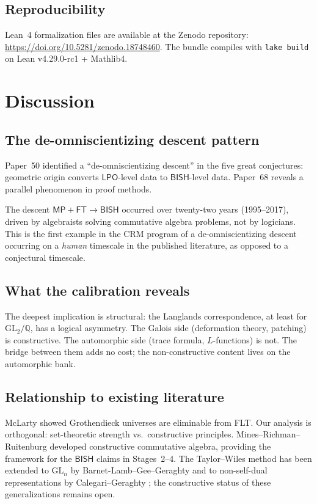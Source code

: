 \documentclass[11pt]{article}
\theoremstyle{plain}
\theoremstyle{definition}
\theoremstyle{remark}
\newcommand{\leanRepo}{\url{https://doi.org/10.5281/zenodo.18748460}}
\newcommand{\Q}{\mathbb{Q}}
\newcommand{\GL}{\mathrm{GL}}
\newcommand{\BISH}{\mathsf{BISH}}
\newcommand{\LPO}{\mathsf{LPO}}
\newcommand{\MP}{\mathsf{MP}}
\newcommand{\FT}{\mathsf{FT}}
\begin{document}
\subsection{Reproducibility}

Lean~4 formalization files are available at the Zenodo repository:
\leanRepo.  The bundle compiles with \texttt{lake build} on Lean
v4.29.0-rc1 + Mathlib4.


\section{Discussion}\label{sec:discuss}

\subsection{The de-omniscientizing descent pattern}

Paper~50 \cite{Paper50} identified a ``de-omniscientizing
descent'' in the five great conjectures: geometric origin converts
$\LPO$-level data to $\BISH$-level data.  Paper~68 reveals a
parallel phenomenon in proof methods.

The descent $\MP + \FT \to \BISH$ occurred over twenty-two
years (1995--2017), driven by algebraists solving commutative
algebra problems, not by logicians.  This is the first example
in the CRM program of a de-omniscientizing descent occurring on a
\emph{human} timescale in the published literature, as opposed
to a conjectural timescale.

\subsection{What the calibration reveals}

The deepest implication is structural: the Langlands
correspondence, at least for $\GL_2/\Q$, has a logical asymmetry.
The Galois side (deformation theory, patching) is constructive.
The automorphic side (trace formula, $L$-functions) is not.  The
bridge between them adds no cost; the non-constructive content
lives on the automorphic bank.

\subsection{Relationship to existing literature}

McLarty \cite{McLarty2010} showed Grothendieck universes are
eliminable from FLT.  Our analysis is orthogonal: set-theoretic
strength vs.\ constructive principles.  Mines--Richman--Ruitenburg
\cite{MRR1988} developed constructive commutative algebra, providing
the framework for the $\BISH$ claims in Stages~2--4.  The
Taylor--Wiles method has been extended to $\GL_n$ by
Barnet-Lamb--Gee--Geraghty \cite{BLGGT2014} and to non-self-dual
representations by Calegari--Geraghty \cite{CalegariGeraghty2018};
the constructive status of these generalizations remains open.
\end{document}
